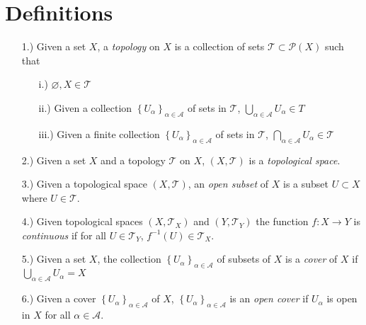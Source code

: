 \documentclass[11pt]{article}
\newcommand{\braces}[1]{\left\{#1\right\}}           %
\begin{document}
\pagestyle{fancy}
\fancyhead{}

\normalsize

\section*{Definitions}
\begin{itemize}
    \item [1.)] Given a set $X$, a \textit{topology} on $X$ is a collection of sets $\mathcal{T}\subset\mathcal{P}(X)$ such that
    \begin{itemize}
        \item [i.)] $\varnothing,X\in\mathcal{T}$
        
        \item [ii.)] Given a collection $\braces{U_\alpha}_{\alpha\in\mathcal{A}}$ of sets in $\mathcal{T}$, $\displaystyle\bigcup_{\alpha\in\mathcal{A}}U_\alpha\in{T}$

        \item [iii.)] Given a finite collection $\braces{U_\alpha}_{\alpha\in\mathcal{A}}$ of sets in $\mathcal{T}$, $\displaystyle\bigcap_{\alpha\in\mathcal{A}}U_\alpha\in\mathcal{T}$
    \end{itemize}

    \item [2.)] Given a set $X$ and a topology $\mathcal{T}$ on $X$, $(X,\mathcal{T})$ is a \textit{topological space}.

    \item [3.)] Given a topological space $(X,\mathcal{T})$, an \textit{open subset} of $X$ is a subset $U\subset X$ where $U\in\mathcal{T}$.

    \item [4.)] Given topological spaces $(X,\mathcal{T}_X)$ and $(Y,\mathcal{T}_Y)$ the function $f:X\to Y$ is \textit{continuous} if for all $U\in\mathcal{T}_Y$, $f^{-1}(U)\in\mathcal{T}_X$.

    \item [5.)] Given a set $X$, the collection $\braces{U_\alpha}_{\alpha\in\mathcal{A}}$ of subsets of $X$ is a \textit{cover} of $X$ if $\displaystyle\bigcup_{\alpha\in\mathcal{A}}U_\alpha=X$

    \item [6.)] Given a cover $\braces{U_\alpha}_{\alpha\in\mathcal{A}}$ of $X$, $\braces{U_\alpha}_{\alpha\in\mathcal{A}}$ is an \textit{open cover} if $U_\alpha$ is open in $X$ for all $\alpha\in\mathcal{A}$.


\end{itemize}
\end{document}
